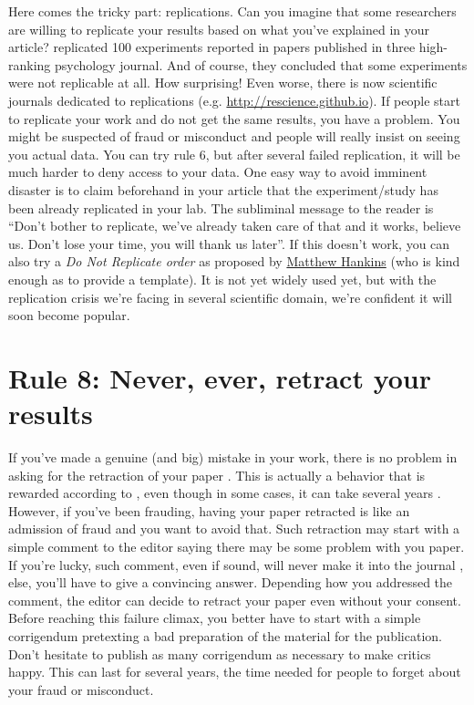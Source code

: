 \documentclass[a4paper,10pt,onecolumn]{article}
\begin{document}
Here comes the tricky part: replications. Can you imagine that some researchers
are willing to replicate your results based on what you've explained in your
article? \citep{nosek:2015} replicated 100 experiments reported in papers
published in three high-ranking psychology journal. And of course, they
concluded that some experiments were not replicable at all. How surprising!
Even worse, there is now scientific journals dedicated to replications
(e.g. \url{http://rescience.github.io}). If people start to replicate your work
and do not get the same results, you have a problem. You might be suspected of
fraud or misconduct and people will really insist on seeing you actual
data. You can try rule 6, but after several failed replication, it will be much
harder to deny access to your data. One easy way to avoid imminent disaster is
to claim beforehand in your article that the experiment/study has been already
replicated in your lab. The subliminal message to the reader is ``Don't bother
to replicate, we've already taken care of that and it works, believe us. Don't
lose your time, you will thank us later''. If this doesn't work, you can also
try a {\em Do Not Replicate order} as proposed by
\href{https://mchankins.wordpress.com/2014/07/12/do-not-replicate/}{Matthew
  Hankins} (who is kind enough as to provide a template). It is not yet widely
used yet, but with the replication crisis we're facing in several scientific
domain, we're confident it will soon become popular.

\section*{Rule 8: Never, ever, retract your results}

If you've made a genuine (and big) mistake in your work, there is no problem in
asking for the retraction of your paper \citep{miller:2006}. This is actually a
behavior that is rewarded according to \citep{lu:2013}, even though in some
cases, it can take several years \citep{trivers:2009}. However, if you've been
frauding, having your paper retracted is like an admission of fraud and you
want to avoid that. Such retraction may start with a simple comment to the
editor saying there may be some problem with you paper. If you're lucky, such
comment, even if sound, will never make it into the journal
\citep{trebino:2009}, else, you'll have to give a convincing answer. Depending
how you addressed the comment, the editor can decide to retract your paper even
without your consent. Before reaching this failure climax, you better have to
start with a simple corrigendum pretexting a bad preparation of the material
for the publication.  Don't hesitate to publish as many corrigendum as
necessary to make critics happy. This can last for several years, the time
needed for people to forget about your fraud or misconduct.
\end{document}
